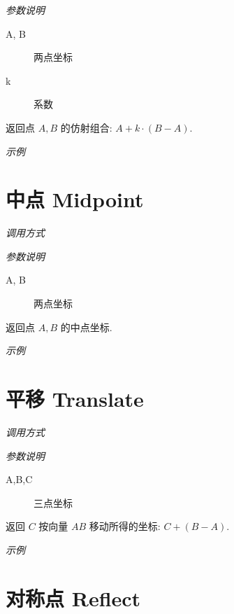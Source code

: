 \emph{参数说明}

\begin{description}
  \item[A, B] 两点坐标
  \item[k] 系数
\end{description}

返回点 $A, B$ 的仿射组合: $A + k \cdot (B-A)$.

\emph{示例}


\section{中点 Midpoint}

\emph{调用方式}

\begin{tcolorbox}{}
\end{tcolorbox}

\emph{参数说明}

\begin{description}
  \item[A, B] 两点坐标
\end{description}

返回点 $A, B$ 的中点坐标.

\emph{示例}


\section{平移 Translate}

\emph{调用方式}

\begin{tcolorbox}{}
\end{tcolorbox}

\emph{参数说明}

\begin{description}
  \item[A,B,C] 三点坐标
\end{description}

返回 $C$ 按向量 $AB$ 移动所得的坐标: $C + (B-A)$.

\emph{示例}


\section{对称点 Reflect}

